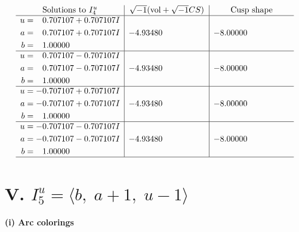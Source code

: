 \documentclass[1p]{elsarticle_modified}
\theoremstyle{definition}
\newcommand{\I}{\sqrt{-1}}
\begin{document}
$$\begin{array}{c|c|c}  
\text{Solutions to }I^u_{4}& \I (\text{vol} + \sqrt{-1}CS) & \text{Cusp shape}\\
 \hline 
\begin{aligned}
u &= \phantom{-}0.707107 + 0.707107 I \\
a &= \phantom{-}0.707107 + 0.707107 I \\
b &= \phantom{-}1.00000\phantom{ +0.000000I}\end{aligned}
 & -4.93480\phantom{ +0.000000I} & -8.00000\phantom{ +0.000000I} \\ \hline\begin{aligned}
u &= \phantom{-}0.707107 - 0.707107 I \\
a &= \phantom{-}0.707107 - 0.707107 I \\
b &= \phantom{-}1.00000\phantom{ +0.000000I}\end{aligned}
 & -4.93480\phantom{ +0.000000I} & -8.00000\phantom{ +0.000000I} \\ \hline\begin{aligned}
u &= -0.707107 + 0.707107 I \\
a &= -0.707107 + 0.707107 I \\
b &= \phantom{-}1.00000\phantom{ +0.000000I}\end{aligned}
 & -4.93480\phantom{ +0.000000I} & -8.00000\phantom{ +0.000000I} \\ \hline\begin{aligned}
u &= -0.707107 - 0.707107 I \\
a &= -0.707107 - 0.707107 I \\
b &= \phantom{-}1.00000\phantom{ +0.000000I}\end{aligned}
 & -4.93480\phantom{ +0.000000I} & -8.00000\phantom{ +0.000000I}\\
 \hline 
 \end{array}$$\newpage\newpage\renewcommand{\arraystretch}{1}
\centering \section*{V. $I^u_{5}= \langle b,\;a+1,\;u-1 \rangle$}
\flushleft \textbf{(i) Arc colorings}\\
\end{document}
